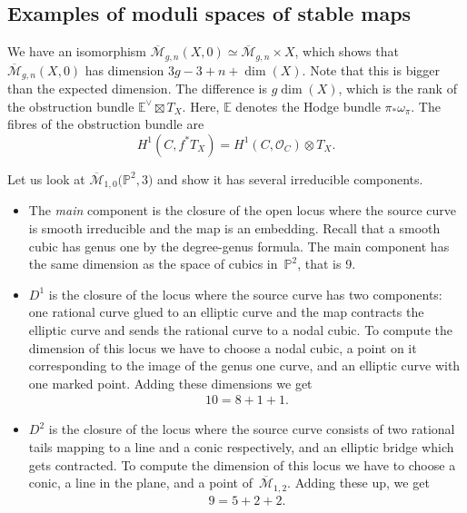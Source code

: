 \documentclass[pdftex]{sigma}
\numberwithin{equation}{section}
\newcommand{\OO}{\mathcal{O}}
\newcommand{\MM}[4]{\overline{\mathcal M}_{#1,#2}(#3,#4)}
\begin{document}
\subsection{Examples of moduli spaces of stable maps}
\begin{Example}
 We have an isomorphism $\MM{g}{n}{X}{0}\simeq \overline{\mathcal M}_{g,n}\times X$, which shows that $\MM{g}{n}{X}{0}$ has dimension $3g-3+n+\dim(X)$. Note that this is bigger than the expected dimension. The difference is $g\dim(X)$, which is the rank of the obstruction bundle $\mathbb E^\vee\boxtimes T_X$. Here, $\mathbb E$ denotes the Hodge bundle $\pi_*\omega_\pi$. The fibres of the obstruction bundle are
 \[H^1(C,f^*T_X)=H^1(C,\OO_C)\otimes T_X.
 \]
 \end{Example}
\begin{Example}
Let us look at $\overline{{\mathcal M}}_{1,0}\big({\mathbb P}^2,3\big)$ and show it has several irreducible components.
\begin{itemize}\itemsep=0pt
 \item The \emph{main} component is the closure of the open locus where the source curve is smooth irreducible and the map is an embedding. Recall that a smooth cubic has genus one by the degree-genus formula. The main component has the same dimension as the space of cubics in~$\mathbb P^2$, that is 9.
 \item $D^1$ is the closure of the locus where the source curve has two components: one rational curve glued to an elliptic curve and the map contracts the elliptic curve and sends the rational curve to a nodal cubic. To compute the dimension of this locus we have to choose a nodal cubic, a point on it corresponding to the image of the genus one curve, and an elliptic curve with one marked point. Adding these dimensions we get \begin{gather*}10=8+1+1.\end{gather*}

 \item $D^2$ is the closure of the locus where the source curve consists of two rational tails mapping to a line and a conic respectively, and an elliptic bridge which gets contracted. To compute the dimension of this locus we have to choose a conic, a line in the plane, and a point of~$\overline{\mathcal M}_{1,2}$. Adding these up, we get \begin{gather*}9=5+2+2.\end{gather*}
 \end{itemize}
 \end{Example}
\end{document}
